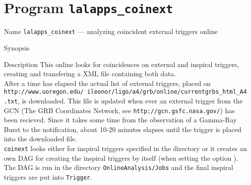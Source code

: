 \section{Program \texttt{lalapps\_coinext}}
\label{program:lalapps-coinext}

\begin{entry}
\item[Name]
\verb$lalapps_coinext$ --- analyzing coincident external triggers online
\item[Synopsis]
                    \newline

\item[Description]
This online looks for coincidences on external and inspiral triggers, creating and transfering a XML file containing both data.\\

After a time  has elapsed the actual list of external triggers, placed on {\tt http://www.uoregon.edu/~ileonor/ligo/a4/grb/online/currentgrbs\_html\_A4.txt}, is downloaded. This file is updated when ever an external trigger from the GCN (The GRB Coordinates Network, see {\tt http://gcn.gsfc.nasa.gov/}) has been recieved. Since it takes some time from the observation of a Gamma-Ray Burst to the notification, about 10-20 minutes elapses until the trigger is placed into the downloaded file.\\


{\tt coinext} looks either for inspiral triggers specified in the directory  or it creates an own DAG for creating the inspiral triggers by itself (when setting the option ). The DAG is run in the directory  {\tt OnlineAnalysis/Jobs} and the final inspiral triggers are put into {\tt Trigger}. \\


\end{entry}
